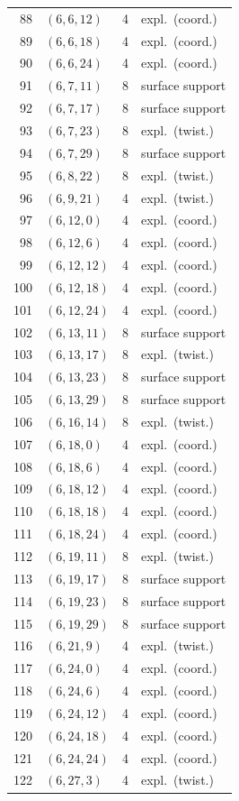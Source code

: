 \documentclass[11pt]{amsart}
\theoremstyle{remark}\newtheorem{remark}[theorem]{Remark}
\begin{document}
{\begin{longtable}{rlrl}
88 & $(6,6,12)$ & 4 & expl.\ (coord.)\\
89 & $(6,6,18)$ & 4 & expl.\ (coord.)\\
90 & $(6,6,24)$ & 4 & expl.\ (coord.)\\
91 & $(6,7,11)$ & 8 & surface support\\
92 & $(6,7,17)$ & 8 & surface support\\
93 & $(6,7,23)$ & 8 & expl.\ (twist.)\\
94 & $(6,7,29)$ & 8 & surface support\\
95 & $(6,8,22)$ & 8 & expl.\ (twist.)\\
96 & $(6,9,21)$ & 4 & expl.\ (twist.)\\
97 & $(6,12,0)$ & 4 & expl.\ (coord.)\\
98 & $(6,12,6)$ & 4 & expl.\ (coord.)\\
99 & $(6,12,12)$ & 4 & expl.\ (coord.)\\
100 & $(6,12,18)$ & 4 & expl.\ (coord.)\\
101 & $(6,12,24)$ & 4 & expl.\ (coord.)\\
102 & $(6,13,11)$ & 8 & surface support\\
103 & $(6,13,17)$ & 8 & expl.\ (twist.)\\
104 & $(6,13,23)$ & 8 & surface support\\
105 & $(6,13,29)$ & 8 & surface support\\
106 & $(6,16,14)$ & 8 & expl.\ (twist.)\\
107 & $(6,18,0)$ & 4 & expl.\ (coord.)\\
108 & $(6,18,6)$ & 4 & expl.\ (coord.)\\
109 & $(6,18,12)$ & 4 & expl.\ (coord.)\\
110 & $(6,18,18)$ & 4 & expl.\ (coord.)\\
111 & $(6,18,24)$ & 4 & expl.\ (coord.)\\
112 & $(6,19,11)$ & 8 & expl.\ (twist.)\\
113 & $(6,19,17)$ & 8 & surface support\\
114 & $(6,19,23)$ & 8 & surface support\\
115 & $(6,19,29)$ & 8 & surface support\\
116 & $(6,21,9)$ & 4 & expl.\ (twist.)\\
117 & $(6,24,0)$ & 4 & expl.\ (coord.)\\
118 & $(6,24,6)$ & 4 & expl.\ (coord.)\\
119 & $(6,24,12)$ & 4 & expl.\ (coord.)\\
120 & $(6,24,18)$ & 4 & expl.\ (coord.)\\
121 & $(6,24,24)$ & 4 & expl.\ (coord.)\\
122 & $(6,27,3)$ & 4 & expl.\ (twist.)\\
\bottomrule\end{longtable}}
\end{document}

